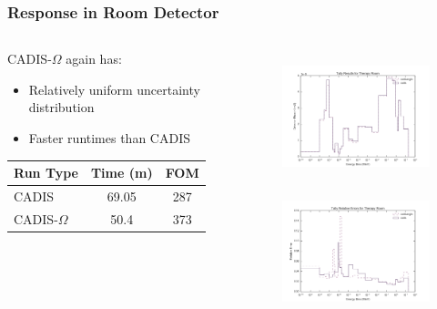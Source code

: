 \documentclass[xcolor=x11names,compress,handout]{beamer}
\renewcommand{\(}{\begin{columns}}
\renewcommand{\)}{\end{columns}}
\newcommand{\<}[1]{\begin{column}{#1}}
\renewcommand{\>}{\end{column}}
\begin{document}
\begin{frame}[fragile]
  \frametitle{Response in Room Detector}
  
\begin{columns}
  \begin{column}{0.45\textwidth}
  CADIS-$\Omega$ again has:
  \begin{itemize}
    \item Relatively uniform uncertainty distribution
    \item Faster runtimes than CADIS
  \end{itemize}
  \vspace*{.5em}
  \begin{tabular}{|l|c c|}
  \hline
      Run Type & Time (m) & FOM \\  
      \hline
      CADIS  & 69.05  &  287 \\
      CADIS-$\Omega$ & 50.4 & 373 \\
      \hline
  \end{tabular}
  \end{column}
  \begin{column}{0.55\textwidth}
  	\begin{figure}
  	\begin{center}
  		\includegraphics[height=1.5in,clip]{../figs/room-both-tally.png}\\
  		\includegraphics[height=1.5in,clip]{../figs/room-both-re.png}
	\end{center}
  	\end{figure}
  \end{column}
\end{columns}
\end{frame}
\end{document}
